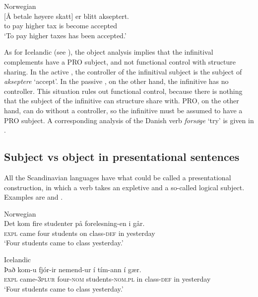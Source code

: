 \documentclass[output=paper,hidelinks]{langscibook}
\begin{document}
\ea\label{ex:Scandinavian:47} Norwegian \citep[71]{Lodrup04}\\
\gll
 {[Å} {betale} {høyere} {skatt]} {er} {blitt} {akseptert}\textsc{.}\\
 \phantom{[}to pay higher tax is become accepted \\
\glt `To pay higher taxes has been accepted.'\z

\noindent As for Icelandic (see ), the object analysis implies that the infinitival complements have a PRO subject, and not functional control with structure sharing. In the active , the controller of the infinitival subject is the subject of \textit{akseptere} `accept'. In the passive , on the other hand, the infinitive has no controller. This situation rules out functional control, because there is nothing that the subject of the infinitive can structure share with. PRO, on the other hand, can do without a controller, so the infinitive must be assumed to have a PRO subject. A corresponding analysis of the Danish verb \textit{forsøge} `try' is given in \citet{orsnes2006}.

\subsection{Subject vs object in presentational sentences}
\label{sec:Scandinavian:3.4}

All the Scandinavian languages have what could be called a presentational construction, in which a verb takes an expletive and a so-called logical subject. Examples are  and .



\ea\label{ex:Scandinavian:48} Norwegian\\
\gll
 {Det} {kom} {fire} {studenter} {på} {forelesning-en} {i} {går.}\\
 \textsc{expl} came four students on class-\textsc{def} in yesterday \\
\glt `Four students came to class yesterday.'\z



\ea\label{ex:Scandinavian:49} Icelandic \citep[310]{Thrainsson07}\\
\gll
 {\MakeUppercase{þ}}{að} {kom-u} {fjór-ir} {nemend-ur} {í} {tím-ann} {í} {gær.}\\
 \textsc{expl} came-\textsc{3plur} four-\textsc{nom} students-\textsc{nom.pl} in class-\textsc{def} in yesterday \\
\glt `Four students came to class yesterday.'\z
\end{document}
